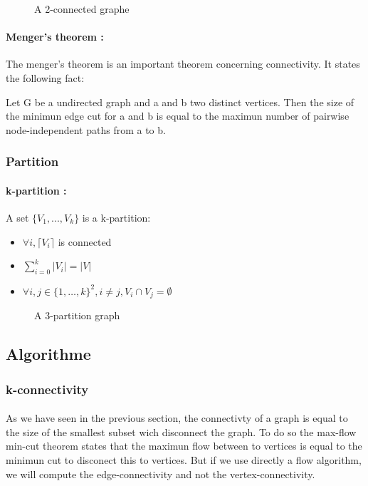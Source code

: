\begin{figure}[!h]
  \begin{center}
    
  \end{center}
  \caption{A 2-connected graphe}
\end{figure}

\paragraph{Menger's theorem :}
The menger's theorem is an important theorem concerning connectivity.
It states the following fact:

Let G be a undirected graph and a and b two distinct vertices.
Then the size of the minimun edge cut for a and b is equal to the maximun number of pairwise node-independent paths from a to b.


\subsubsection{Partition}
\paragraph{k-partition :}
A set $\{V_1,...,V_k\}$ is a k-partition:
\begin{itemize}
    \item $\forall i, \lceil V_i \rceil$ is connected
    \item $\sum\limits_{i=0}^k|V_i| = |V|$
    \item $\forall i,j \in \{1, \dots, k\}^2, i \neq j, V_i \cap V_j = \emptyset$
\end{itemize}

\begin{figure}[!h]
    \begin{center}
        
    \end{center}
    \caption{A 3-partition graph}
\end{figure}

\subsection{Algorithme}
\subsubsection{k-connectivity}
\paragraph{}
As we have seen in the previous section, the connectivty of a graph is equal to the size of the smallest subset wich disconnect the graph.
To do so the max-flow min-cut theorem states that the maximun flow between to vertices is equal to the minimun cut to disconect this to vertices.
But if we use directly a flow algorithm, we will compute the edge-connectivity and not the vertex-connectivity.

